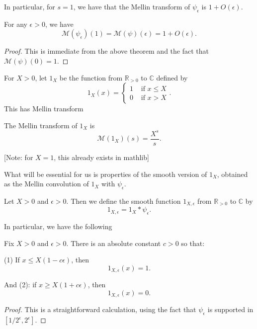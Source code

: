 In particular, for $s=1$, we have that the Mellin transform of $\psi_\epsilon$ is $1+O(\epsilon)$.
\begin{corollary}\label{MellinOfDeltaSpikeAt1}
For any $\epsilon>0$, we have
$$\mathcal{M}(\psi_\epsilon)(1) =
\mathcal{M}(\psi)(\epsilon)= 1+O(\epsilon).$$
\end{corollary}



\begin{proof}
This is immediate from the above theorem and the fact that $\mathcal{M}(\psi)(0)=1$.
\end{proof}



For $X>0$, let $1_X$ be the function from $\mathbb{R}_{>0}$ to $\mathbb{C}$ defined by
$$1_X(x) = \begin{cases}
1 & \text{ if }x\leq X\\
0 & \text{ if }x>X
\end{cases}.$$
This has Mellin transform
\begin{theorem}\label{MellinOf1X}
The Mellin transform of $1_X$ is
$$\mathcal{M}(1_X)(s) = \frac{X^s}{s}.$$
\end{theorem}
[Note: for $X=1$, this already exists in mathlib]



What will be essential for us is properties of the smooth version of $1_X$, obtained as the
 Mellin convolution of $1_X$ with $\psi_\epsilon$.
\begin{definition}\label{Smooth1X}
Let $X>0$ and $\epsilon>0$. Then we define the smooth function $1_{X,\epsilon}$ from $\mathbb{R}_{>0}$ to $\mathbb{C}$ by
$$1_{X,\epsilon} = 1_X\ast\psi_\epsilon.$$
\end{definition}



In particular, we have the following
\begin{lemma}\label{Smooth1XProperties}
Fix $X>0$ and $\epsilon>0$. There is an absolute constant $c>0$ so that:

(1) If $x\leq X(1-c\epsilon)$, then
$$1_{X,\epsilon}(x) = 1.$$

And (2):
if $x\geq X(1+c\epsilon)$, then
$$1_{X,\epsilon}(x) = 0.$$
\end{lemma}



\begin{proof}
This is a straightforward calculation, using the fact that $\psi_\epsilon$ is supported in $[1/2^\epsilon,2^\epsilon]$.
\end{proof}



